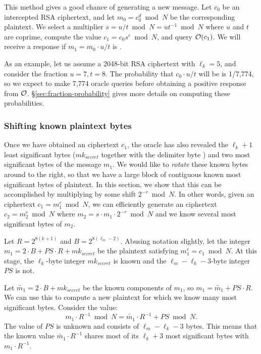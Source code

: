 This method gives a good chance of generating a new \sslconform message. 
Let $c_0$ be an intercepted \tlsconform RSA ciphertext, and let $m_0 = c_0^d \bmod N$ be the \ifext corresponding \fi plaintext.  We select a multiplier $s = u/t \bmod N = u t^{-1} \bmod N$ where $u$ and $t$ are coprime, compute the value $c_1 = c_0 s^e \bmod N$, and query $\mathcal{O}(c_1)$.  We will receive a response if $m_1 = m_0 \cdot u/t$ is \sslconform.  

As an example, let us assume a 2048-bit RSA ciphertext with $\ell_k = 5$, and consider the fraction $u = 7, t = 8$.  The probability that $c_0 \cdot u/t$ will be \sslconform is 1/7,774, so we expect to make 7,774 oracle queries before obtaining a positive response from $\mathcal{O}$. \S\ref{sec:fraction-probability} gives more details on computing these probabilities.

\subsubsection{Shifting known plaintext bytes}
\label{sec:rotations}
Once we have obtained an \sslconform ciphertext $c_1$, the oracle has also revealed the $\ell_k+1$ least significant bytes ($mk_{secret}$ together with the delimiter byte ) and two most significant  bytes of the \sslconform message $m_1$.  We would like to \emph{rotate} these known bytes around to the right, so that we have a large block of contiguous known most significant bytes of plaintext.
In this section, we show that this can be accomplished by multiplying by some shift $2^{-r} \bmod N$.  In other words, given an \sslconform ciphertext $c_1 = m_1^e \bmod N$, we can efficiently generate an \sslconform ciphertext $c_2 = m_2^e \bmod N$ where $m_2 = s \cdot m_1 \cdot 2^{-r} \bmod N$ and we know several most significant bytes of $m_2$. 

Let $R = 2^{8(k+1)}$ and $B = 2^{8(\ell_m-2)}$. Abusing notation slightly, let the integer $m_1 = 2 \cdot B + PS \cdot R + mk_{secret}$ be the plaintext satisfying $m_1^e = c_1 \bmod N$.  At this stage, the $\ell_k$-byte integer $mk_{secret}$ is known and the $\ell_m-\ell_k-3$-byte integer $PS$ is not.

Let $\tilde{m_1} = 2 \cdot B + mk_{secret}$ be the known components of $m_1$, so $m_1 = \tilde{m_1} + PS \cdot R$. We can use this to compute a new plaintext for which we know many most significant bytes.  Consider the value:
\[
m_1 \cdot R^{-1} \bmod N = \tilde{m_1} \cdot R^{-1} + PS \bmod N.
\]
The value of $PS$ is unknown and consists of $\ell_m-\ell_k-3$ bytes.  This means that the known value $\tilde{m_1} \cdot R^{-1}$ shares most of its $\ell_k+3$ most significant bytes with $m_1 \cdot R^{-1}$.

